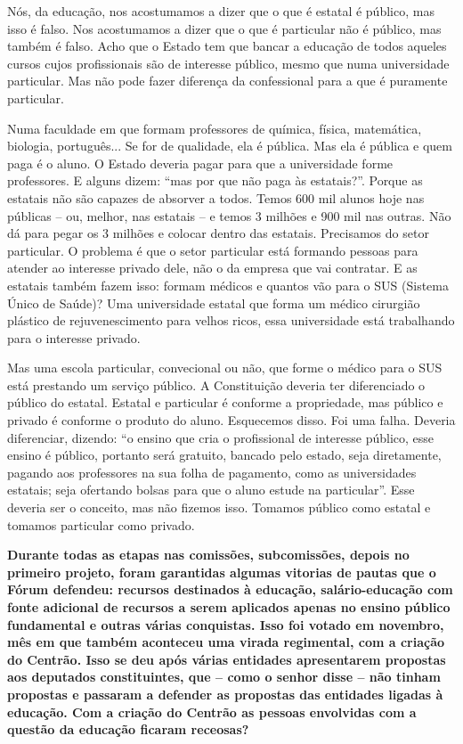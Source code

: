 Nós, da educação, nos acostumamos a dizer que o que é estatal é público,
mas isso é falso. Nos acostumamos a dizer que o que é particular não é
público, mas também é falso. Acho que o Estado tem que bancar a educação
de todos aqueles cursos cujos profissionais são de interesse público,
mesmo que numa universidade particular. Mas não pode fazer diferença da
confessional para a que é puramente particular.

Numa faculdade em que formam professores de química, física, matemática,
biologia, português... Se for de qualidade, ela é pública. Mas ela é
pública e quem paga é o aluno. O Estado deveria pagar para que a
universidade forme professores. E alguns dizem: ``mas por que não paga
às estatais?''. Porque as estatais não são capazes de absorver a todos.
Temos 600 mil alunos hoje nas públicas -- ou, melhor, nas estatais -- e
temos 3 milhões e 900 mil nas outras. Não dá para pegar os 3 milhões e
colocar dentro das estatais. Precisamos do setor particular. O problema
é que o setor particular está formando pessoas para atender ao interesse
privado dele, não o da empresa que vai contratar. E as estatais também
fazem isso: formam médicos e quantos vão para o SUS (Sistema Único de
Saúde)? Uma universidade estatal que forma um médico cirurgião plástico
de rejuvenescimento para velhos ricos, essa universidade está
trabalhando para o interesse privado.

Mas uma escola particular, convecional ou não, que forme o médico para o
SUS está prestando um serviço público. A Constituição deveria ter
diferenciado o público do estatal. Estatal e particular é conforme a
propriedade, mas público e privado é conforme o produto do aluno.
Esquecemos disso. Foi uma falha. Deveria diferenciar, dizendo: ``o
ensino que cria o profissional de interesse público, esse ensino é
público, portanto será gratuito, bancado pelo estado, seja diretamente,
pagando aos professores na sua folha de pagamento, como as universidades
estatais; seja ofertando bolsas para que o aluno estude na particular''.
Esse deveria ser o conceito, mas não fizemos isso. Tomamos público como
estatal e tomamos particular como privado.

\textbf{Durante todas as etapas nas comissões, subcomissões, depois no
primeiro projeto, foram garantidas algumas vitorias de pautas que o
Fórum defendeu: recursos destinados à educação, salário-educação com
fonte adicional de recursos a serem aplicados apenas no ensino público
fundamental e outras várias conquistas. Isso foi votado em novembro, mês
em que também aconteceu uma virada regimental, com a criação do Centrão.
Isso se deu após várias entidades apresentarem propostas aos deputados
constituintes, que -- como o senhor disse -- não tinham propostas e
passaram a defender as propostas das entidades ligadas à educação. Com a
criação do Centrão as pessoas envolvidas com a questão da educação
ficaram receosas?}

